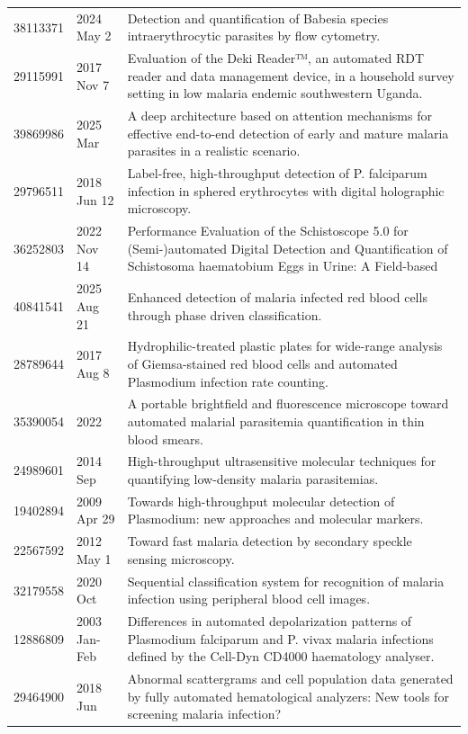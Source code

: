 \begin{longtable}{llp{9.5cm}}
38113371 & 2024 May 2 & Detection and quantification of Babesia species intraerythrocytic parasites by flow cytometry. \\
29115991 & 2017 Nov 7 & Evaluation of the Deki Reader™, an automated RDT reader and data management device, in a household survey setting in low malaria endemic southwestern Uganda. \\
39869986 & 2025 Mar & A deep architecture based on attention mechanisms for effective end-to-end detection of early and mature malaria parasites in a realistic scenario. \\
29796511 & 2018 Jun 12 & Label-free, high-throughput detection of P. falciparum infection in sphered erythrocytes with digital holographic microscopy. \\
36252803 & 2022 Nov 14 & Performance Evaluation of the Schistoscope 5.0 for (Semi-)automated Digital Detection and Quantification of Schistosoma haematobium Eggs in Urine: A Field-based \\
40841541 & 2025 Aug 21 & Enhanced detection of malaria infected red blood cells through phase driven classification. \\
28789644 & 2017 Aug 8 & Hydrophilic-treated plastic plates for wide-range analysis of Giemsa-stained red blood cells and automated Plasmodium infection rate counting. \\
35390054 & 2022 & A portable brightfield and fluorescence microscope toward automated malarial parasitemia quantification in thin blood smears. \\
24989601 & 2014 Sep & High-throughput ultrasensitive molecular techniques for quantifying low-density malaria parasitemias. \\
19402894 & 2009 Apr 29 & Towards high-throughput molecular detection of Plasmodium: new approaches and molecular markers. \\
22567592 & 2012 May 1 & Toward fast malaria detection by secondary speckle sensing microscopy. \\
32179558 & 2020 Oct & Sequential classification system for recognition of malaria infection using peripheral blood cell images. \\
12886809 & 2003 Jan-Feb & Differences in automated depolarization patterns of Plasmodium falciparum and P. vivax malaria infections defined by the Cell-Dyn CD4000 haematology analyser. \\
29464900 & 2018 Jun & Abnormal scattergrams and cell population data generated by fully automated hematological analyzers: New tools for screening malaria infection? \\

\end{longtable}
